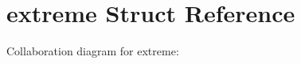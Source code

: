 \hypertarget{structextreme}{}\section{extreme Struct Reference}
\label{structextreme}


Collaboration diagram for extreme\+:
